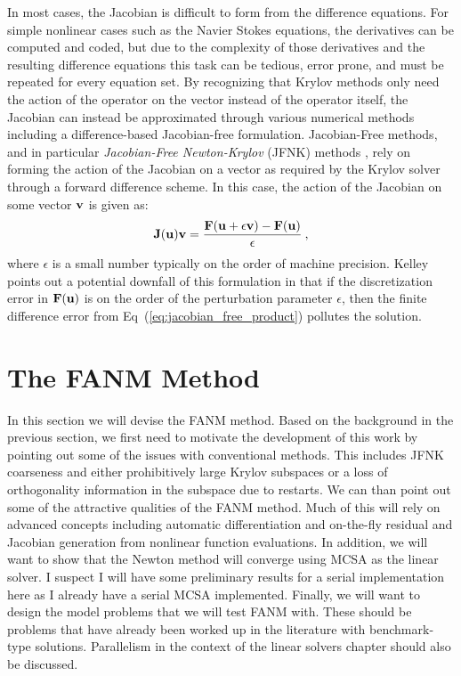 In most cases, the Jacobian is difficult to form from the difference
equations. For simple nonlinear cases such as the Navier Stokes
equations, the derivatives can be computed and coded, but due to the
complexity of those derivatives and the resulting difference equations
this task can be tedious, error prone, and must be repeated for every
equation set. By recognizing that Krylov methods only need the action
of the operator on the vector instead of the operator itself, the
Jacobian can instead be approximated through various numerical methods
including a difference-based Jacobian-free formulation. Jacobian-Free
methods, and in particular \textit{Jacobian-Free Newton-Krylov} (JFNK)
methods \citep{knoll_jacobian-free_2004}, rely on forming the action
of the Jacobian on a vector as required by the Krylov solver through a
forward difference scheme. In this case, the action of the Jacobian on
some vector $\mathbf{v}$ is given as:
\begin{equation}
  \mathbf{J}(\mathbf{u})\mathbf{v} = \frac{\mathbf{F}(\mathbf{u} + \epsilon \mathbf{v}) -
    \mathbf{F}(\mathbf{u})}{\epsilon}\:,
  \label{eq:jacobian_free_product}
\end{equation}
where $\epsilon$ is a small number typically on the order of machine
precision. Kelley \citep{kelley_iterative_1995} points out a potential
downfall of this formulation in that if the discretization error in
$\mathbf{F}(\mathbf{u})$ is on the order of the perturbation parameter
$\epsilon$, then the finite difference error from
Eq~(\ref{eq:jacobian_free_product}) pollutes the solution.

\section{The FANM Method}
\label{sec:fanm}
In this section we will devise the FANM method. Based on the
background in the previous section, we first need to motivate the
development of this work by pointing out some of the issues with
conventional methods. This includes JFNK coarseness and either
prohibitively large Krylov subspaces or a loss of orthogonality
information in the subspace due to restarts. We can than point out
some of the attractive qualities of the FANM method. Much of this will
rely on advanced concepts including automatic differentiation and
on-the-fly residual and Jacobian generation from nonlinear function
evaluations. In addition, we will want to show that the Newton method
will converge using MCSA as the linear solver. I suspect I will have
some preliminary results for a serial implementation here as I already
have a serial MCSA implemented. Finally, we will want to design the
model problems that we will test FANM with. These should be problems
that have already been worked up in the literature with benchmark-type
solutions. Parallelism in the context of the linear solvers chapter
should also be discussed.

